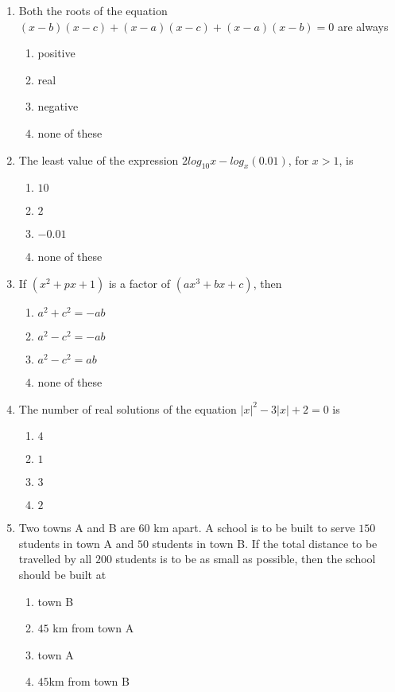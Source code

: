 \documentclass[journal,12pt,twocolumn]{IEEEtran}
\begin{document}
\begin{enumerate}[label=\arabic*]
\item Both the roots of the equation $(x-b)(x-c)+(x-a)(x-c)+(x-a)(x-b)=0$ are always
\begin{enumerate}
\item positive
\item real 
\item negative
\item none of these
\end{enumerate}

\item The least value of the expression $2 log_{10}x-log_{x}(0.01)$, for $x>1$, is
\begin{enumerate}
\item $10$
\item $2$ 
\item $-0.01$
\item none of these
\end{enumerate}

\item If $(x^{2}+px+1)$ is a factor of $(ax^{3}+bx+c)$, then
\begin{enumerate}
\item $a^{2}+c^{2}=-ab$
\item $a^{2}-c^{2}=-ab$ 
\item $a^{2}-c^{2}=ab$
\item none of these
\end{enumerate}

\item The number of real solutions of the equation $|x|^{2}-3|x|+2=0$ is
\begin{enumerate}
\item $4$
\item $1$ 
\item $3$
\item $2$ 
\end{enumerate}

\item Two towns A and B are 60 km apart. A school is to be built to serve $150$ students in town A and $50$ students in town B. If the total distance to be travelled by all $200$ students is to be as small as possible, then the school should be built at
\begin{enumerate}
\item town B
\item $45$ km from town A
\item town A
\item $45$km from town B
\end{enumerate}


\end{enumerate}
\end{document}
